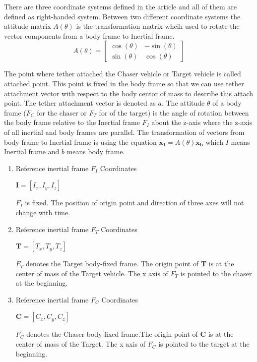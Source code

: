There are three coordinate systems defined in the article and all of them are defined as right-handed system. Between two different coordinate systems the attitude matrix $A(\theta)$ is the transformation matrix whcih used to rotate the vector components from a body frame to Inertial frame. 
\[A(\theta) =
	\begin{bmatrix}
	\cos(\theta) & -\sin(\theta) \\
	\sin(\theta) & \cos(\theta)
	\end{bmatrix}
\]

	The point where tether attached the Chaser vehicle or Target vehicle is called attached point. This point is fixed in the body frame so that we can use tether attachment vector with respect to the body centor of mass to describe this attach point. The tether attachment vector is denoted as $a$.
The attitude $\theta$  of a body frame ($F_C$ for the chaser or $F_T$ for of the target) is the angle of rotation between the body frame relative to the Inertial frame $F_I$ about the z-axis where the z-axis of all inertial and body frames are parallel. The transformation of vectors from body frame to Inertial frame is using the equation  $\mathbf{x_I}=A(\theta)\mathbf{x_b}$ which $I$ means Inertial frame and $b$ means body frame.
\boldmath
\begin{enumerate}

\item Reference inertial frame $F_I$ Coordinates\\		
\begin{center} $\textbf{I} =[I_x, I_y, I_z]$ \end{center}
\textbf {$F_I$} is fixed. The position of origin point and direction of three axes will not change with time.    


\item Reference inertial frame $F_T$ Coordinates\\		
\begin{center} $\textbf{T} =[T_x, T_y, T_z]$ \end{center}
\textbf{$F_T$} denotes the Target body-fixed frame. The origin point of \textbf{T} is at the center of mass of the Target vehicle. The x axis of $F_T$ is pointed to the chaser at the beginning. 

\item Reference inertial frame $F_C$ Coordinates\\		
\begin{center} $\textbf{C} =[C_x, C_y, C_z]$ \end{center}
\textbf{$F_C$} denotes the Chaser body-fixed frame.The origin point of \textbf{C} is at the center of mass of the Target. The x axis of $F_C$ is pointed to the target at the beginning. 
\end{enumerate}
\unboldmath

